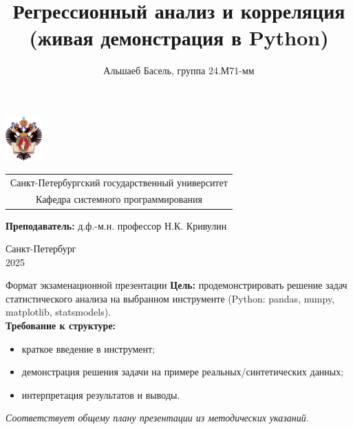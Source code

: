 \documentclass{beamer}
\title[Регрессия и корреляция в Python]{Регрессионный анализ и корреляция\\(живая демонстрация в Python)}
\institute[СПбГУ]{\\ Курс «Методы статистической обработки информации»}
\author[Альшаеб Басель]{Альшаеб Басель, группа 24.М71-мм}
\begin{document}
{
\begin{frame}
  \includegraphics[width=1.4cm]{pictures/SPbGU_Logo.png}
\vspace{-35pt}
\hspace{-10pt}
\begin{center}
   \begin{tabular}{c}
        \scriptsize{Санкт-Петербургский государственный университет} \\
        \scriptsize{Кафедра системного программирования}
    \end{tabular}
\titlepage
\end{center}

\btVFill

{\scriptsize
   \textbf{Преподаватель:} д.ф.-м.н. профессор Н.К. Кривулин \\
 }
\begin{center}
  \vspace{5pt}
  \scriptsize{Санкт-Петербург\\
                 2025}
  \end{center}

\end{frame}
}


\begin{frame}{Формат экзаменационной презентации}
\textbf{Цель:} продемонстрировать решение задач статистического анализа на выбранном инструменте (Python: pandas, numpy, matplotlib, statsmodels).\\[4pt]
\textbf{Требование к структуре:}
\begin{itemize}
  \item краткое введение в инструмент;
  \item демонстрация решения задачи на примере реальных/синтетических данных;
  \item интерпретация результатов и выводы.
\end{itemize}
\textit{Соответствует общему плану презентации из методических указаний.}
\end{frame}
\end{document}
